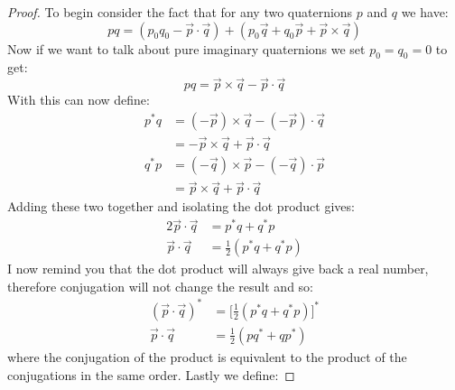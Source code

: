 \documentclass[12pt, letterpaper, onecolumn, conference, final]{IEEEtran}
\theoremstyle{definition}
\theoremstyle{plain}
\begin{document}
\begin{proof}
To begin consider the fact that for any two quaternions $p$ and $q$ we have:
\begin{equation*}
pq = (p_0q_0 - \overrightarrow{p} \cdot \overrightarrow{q}) + (p_0\overrightarrow{q} + q_0\overrightarrow{p} + \overrightarrow{p} \times \overrightarrow{q})
\end{equation*}
Now if we want to talk about pure imaginary quaternions we set $p_0 = q_0 = 0$ to get:
\begin{equation*}
pq = \overrightarrow{p} \times \overrightarrow{q} - \overrightarrow{p} \cdot \overrightarrow{q}
\end{equation*}
With this can now define:
\begin{equation*}
\begin{split}
p^*q &= (-\overrightarrow{p}) \times \overrightarrow{q} - (-\overrightarrow{p}) \cdot \overrightarrow{q} \\
&= -\overrightarrow{p} \times \overrightarrow{q} + \overrightarrow{p} \cdot \overrightarrow{q} \\
q^*p &= (-\overrightarrow{q}) \times \overrightarrow{p} - (-\overrightarrow{q}) \cdot \overrightarrow{p} \\
&= \overrightarrow{p} \times \overrightarrow{q} + \overrightarrow{p} \cdot \overrightarrow{q}
\end{split}
\end{equation*}
Adding these two together and isolating the dot product gives:
\begin{equation*}
\begin{split}
2\overrightarrow{p} \cdot \overrightarrow{q} &= p^*q + q^*p \\
\overrightarrow{p} \cdot \overrightarrow{q} &= \frac{1}{2}(p^*q + q^*p)
\end{split}
\end{equation*}
I now remind you that the dot product will always give back a real number, therefore conjugation will not change the result and so:
\begin{equation*}
\begin{split}
(\overrightarrow{p} \cdot \overrightarrow{q})^* &= \Big[ \frac{1}{2}(p^*q + q^*p) \Big]^* \\
\overrightarrow{p} \cdot \overrightarrow{q} &= \frac{1}{2}(pq^* + qp^*)
\end{split}
\end{equation*}
where the conjugation of the product is equivalent to the product of the conjugations in the same order. Lastly we define:

\end{proof}
\end{document}
